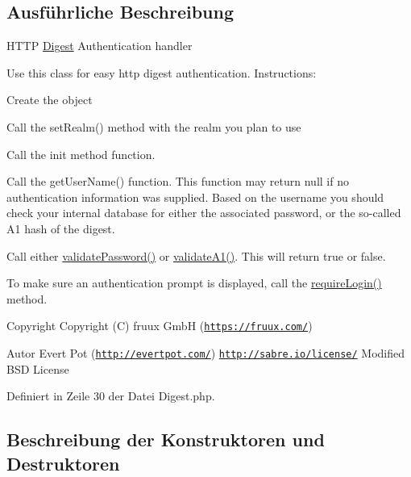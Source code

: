 \subsection{Ausführliche Beschreibung}
H\+T\+TP \mbox{\hyperlink{class_sabre_1_1_h_t_t_p_1_1_auth_1_1_digest}{Digest}} Authentication handler

Use this class for easy http digest authentication. Instructions\+:


\begin{DoxyEnumerate}
\item Create the object
\item Call the set\+Realm() method with the realm you plan to use
\item Call the init method function.
\item Call the get\+User\+Name() function. This function may return null if no authentication information was supplied. Based on the username you should check your internal database for either the associated password, or the so-\/called A1 hash of the digest.
\item Call either \mbox{\hyperlink{class_sabre_1_1_h_t_t_p_1_1_auth_1_1_digest_a4bc25689fa17ba401cab58832cc62c25}{validate\+Password()}} or \mbox{\hyperlink{class_sabre_1_1_h_t_t_p_1_1_auth_1_1_digest_a5598d7b0be03b258c592384cb00aa26b}{validate\+A1()}}. This will return true or false.
\item To make sure an authentication prompt is displayed, call the \mbox{\hyperlink{class_sabre_1_1_h_t_t_p_1_1_auth_1_1_digest_aedfbedd45800cddf8528fee9a017561f}{require\+Login()}} method.
\end{DoxyEnumerate}

\begin{DoxyCopyright}{Copyright}
Copyright (C) fruux GmbH (\href{https://fruux.com/}{\tt https\+://fruux.\+com/}) 
\end{DoxyCopyright}
\begin{DoxyAuthor}{Autor}
Evert Pot (\href{http://evertpot.com/}{\tt http\+://evertpot.\+com/})  \href{http://sabre.io/license/}{\tt http\+://sabre.\+io/license/} Modified B\+SD License 
\end{DoxyAuthor}


Definiert in Zeile 30 der Datei Digest.\+php.



\subsection{Beschreibung der Konstruktoren und Destruktoren}
\mbox{\label{class_sabre_1_1_h_t_t_p_1_1_auth_1_1_digest_af86154e7d1c3ee6d78eaf7b9bfdd9e7c}} 
